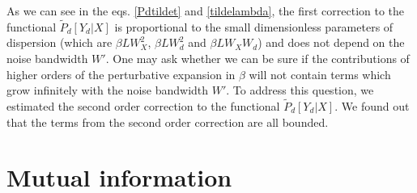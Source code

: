 \documentclass{article}
\begin{document}
As we can see in the eqs. \eqref{Pdtildet} and \eqref{tildelambda}, the first correction to the functional $\tilde{P}_{d}[Y_{d}|X]$ is proportional to the small dimensionless parameters of dispersion (which are $\beta L W_{X}^{2}$, $\beta L W_{d}^{2}$ and $\beta L W_{X}W_{d}$) and does not depend on the noise bandwidth $W'$. One may ask whether we can be sure if the contributions of higher orders of the perturbative expansion in $\beta$ will not contain terms which grow infinitely with the noise bandwidth $W'$. To address this question, we estimated the second order correction to the functional $\tilde{P}_{d}[Y_{d}|X]$. We found out that the terms from the second order correction are all bounded.









\section{Mutual information}
\end{document}

